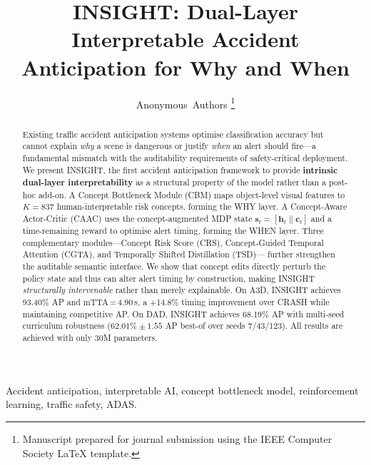 \documentclass[lettersize,journal]{IEEEtran}
\newcommand{\method}{\textsc{INSIGHT}}
\newcommand{\caac}{\textsc{CAAC}}
\newcommand{\cgta}{\textsc{CGTA}}
\newcommand{\crs}{\textsc{CRS}}
\newcommand{\tsd}{\textsc{TSD}}
\newcommand{\cbm}{\textsc{CBM}}
\begin{document}
\title{\method: Dual-Layer Interpretable Accident Anticipation for Why and When}

\author{Anonymous~Authors
\thanks{Manuscript prepared for journal submission using the
IEEE Computer Society LaTeX template.}}

\maketitle

\begin{abstract}
Existing traffic accident anticipation systems optimise classification
accuracy but cannot explain \emph{why} a scene is dangerous or justify
\emph{when} an alert should fire---a fundamental mismatch with the
auditability requirements of safety-critical deployment.
We present \method{}, the first accident anticipation framework to provide
\textbf{intrinsic dual-layer interpretability} as a structural property
of the model rather than a post-hoc add-on.
A Concept Bottleneck Module (\cbm) maps object-level visual features to
$K{=}837$ human-interpretable risk concepts, forming the WHY layer.
A Concept-Aware Actor-Critic (\caac) uses the concept-augmented MDP state
$\mathbf{s}_t=[\mathbf{h}_t\|\mathbf{c}_t]$ and a time-remaining reward
to optimise alert timing, forming the WHEN layer.
Three complementary modules---Concept Risk Score (\crs), Concept-Guided
Temporal Attention (\cgta), and Temporally Shifted Distillation (\tsd)---
further strengthen the auditable semantic interface.
We show that concept edits directly perturb the policy state and thus can
alter alert timing by construction, making \method{} \emph{structurally
intervenable} rather than merely explainable.
On A3D, \method{} achieves 93.40\% AP and mTTA\,=\,4.90\,s,
a +14.8\% timing improvement over CRASH while maintaining competitive AP.
On DAD, \method{} achieves 68.19\% AP with multi-seed curriculum robustness
($62.01\%\pm1.55$ AP best-of over seeds 7/43/123).
All results are achieved with only 30M parameters.
\end{abstract}

\begin{IEEEkeywords}
Accident anticipation, interpretable AI, concept bottleneck model,
reinforcement learning, traffic safety, ADAS.
\end{IEEEkeywords}



\end{document}

